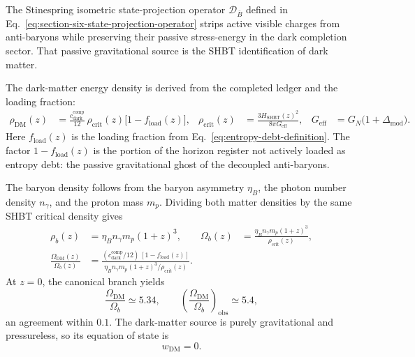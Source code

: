 \documentclass[11pt,letterpaper]{article}
\theoremstyle{plain}
\newcommand{\cdarkcomp}{c_{\text{dark}}^{\text{comp}}}
\newcommand{\GN}{G_N}
\newcommand{\DeltaMod}{\Delta_{\text{mod}}}
\newcommand{\fload}{f_{\text{load}}}
\begin{document}
The Stinespring isometric state-projection operator \(\mathcal D_{\bar B}\) defined in
Eq.~\eqref{eq:section-six-state-projection-operator} strips active visible charges
from anti-baryons while preserving their passive stress-energy in the dark
completion sector.  That passive gravitational source is the SHBT
identification of dark matter.

The dark-matter energy density is derived from the completed ledger and the
loading fraction:
\begin{equation*}
\tag{DM1}\label{eq:dm-density}
\begin{aligned}
 \rho_{\text{DM}}(z)
 &=
 \frac{\cdarkcomp}{12}\,
 \rho_{\text{crit}}(z)\bigl[1-\fload(z)\bigr],
 &
 \rho_{\text{crit}}(z)
 &=
 \frac{3H_{\text{SHBT}}(z)^2}{8\pi G_{\text{eff}}},
 &
 G_{\text{eff}}
 &=
 \GN\bigl(1+\DeltaMod\bigr).
\end{aligned}
\end{equation*}
Here \(\fload(z)\) is the loading fraction from
Eq.~\eqref{eq:entropy-debt-definition}.  The factor
\(1-\fload(z)\) is the portion of the horizon register not actively loaded as
entropy debt: the passive gravitational ghost of the decoupled anti-baryons.

The baryon density follows from the baryon asymmetry \(\eta_B\), the photon
number density \(n_\gamma\), and the proton mass \(m_p\).  Dividing both matter
densities by the same SHBT critical density gives
\begin{equation*}
\tag{DM2}\label{eq:dm-baryon-ratio}
\begin{aligned}
 \rho_b(z)
 &=
 \eta_B n_\gamma m_p(1+z)^3,
 &
 \Omega_b(z)
 &=
 \frac{\eta_B n_\gamma m_p(1+z)^3}{\rho_{\text{crit}}(z)},
 \\
 \frac{\Omega_{\text{DM}}(z)}{\Omega_b(z)}
 &=
 \frac{(\cdarkcomp/12)\,[1-\fload(z)]}
 {\eta_B n_\gamma m_p(1+z)^3/\rho_{\text{crit}}(z)}.
\end{aligned}
\end{equation*}
At \(z=0\), the canonical branch yields
\begin{equation*}
 \frac{\Omega_{\text{DM}}}{\Omega_b}\simeq5.34,
 \qquad
 \left(\frac{\Omega_{\text{DM}}}{\Omega_b}\right)_{\text{obs}}\simeq5.4,
\end{equation*}
an agreement within \(0.1\).  The dark-matter source is purely gravitational
and pressureless, so its equation of state is
\begin{equation*}
\tag{DM3}\label{eq:dm-eos}
 w_{\text{DM}}=0.
\end{equation*}
\end{document}
